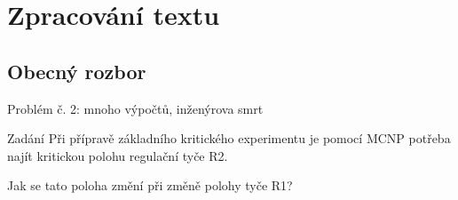 \documentclass{beamer}
\begin{document}
%
%
%
%
%
%
%
%

\section{Zpracování textu}

\subsection{Obecný rozbor}

\begin{frame}{Problém č. 2: mnoho výpočtů, inženýrova smrt}
  \begin{block}{Zadání}
    Při přípravě základního kritického experimentu je pomocí MCNP potřeba najít kritickou polohu regulační tyče R2.

    Jak se tato poloha změní při změně polohy tyče R1?
  \end{block}
\end{frame}
\end{document}
